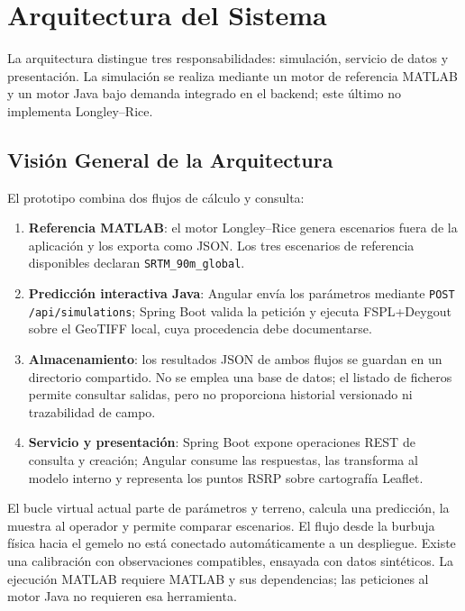 \section{Arquitectura del Sistema}
\label{sec:arquitectura}

La arquitectura distingue tres responsabilidades: simulación, servicio de datos y
presentación. La simulación se realiza mediante un motor de referencia MATLAB y un motor
Java bajo demanda integrado en el backend; este último no implementa Longley--Rice.

\subsection{Visión General de la Arquitectura}
\label{subsec:arq_general}

El prototipo combina dos flujos de cálculo y consulta:

\begin{enumerate}
  \item \textbf{Referencia MATLAB}: el motor Longley--Rice genera escenarios fuera de la
    aplicación y los exporta como JSON. Los tres escenarios de referencia disponibles
    declaran \texttt{SRTM\_90m\_global}.
  \item \textbf{Predicción interactiva Java}: Angular envía los parámetros mediante
    \texttt{POST /api/simulations}; Spring Boot valida la petición y ejecuta FSPL+Deygout
    sobre el GeoTIFF local, cuya procedencia debe documentarse.
  \item \textbf{Almacenamiento}: los resultados JSON de ambos flujos se guardan en un
    directorio compartido. No se emplea una base de datos; el listado de ficheros permite
    consultar salidas, pero no proporciona historial versionado ni trazabilidad de campo.
  \item \textbf{Servicio y presentación}: Spring Boot expone operaciones REST de consulta
    y creación; Angular consume las respuestas, las transforma al modelo interno y
    representa los puntos RSRP sobre cartografía Leaflet.
\end{enumerate}

El bucle virtual actual parte de parámetros y terreno, calcula una predicción, la muestra
al operador y permite comparar escenarios. El flujo desde la burbuja física hacia el
gemelo no está conectado automáticamente a un despliegue. Existe una calibración con
observaciones compatibles, ensayada con datos sintéticos. La ejecución MATLAB requiere MATLAB y sus dependencias; las peticiones al
motor Java no requieren esa herramienta.

